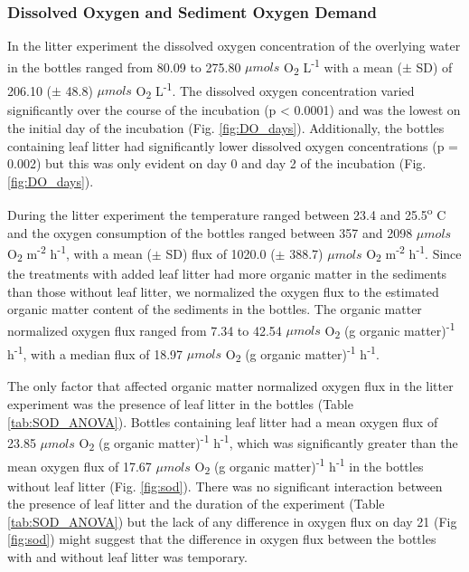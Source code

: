 \subsubsection{Dissolved Oxygen and Sediment Oxygen Demand}
In the litter experiment the dissolved oxygen concentration of the overlying water in the bottles ranged from 80.09 to 275.80 $\mu mols$ O\textsubscript{2} L\textsuperscript{-1} with a mean ($\pm$ SD) of 206.10 ($\pm$ 48.8) $\mu mols$ O\textsubscript{2} L\textsuperscript{-1}.  The dissolved oxygen concentration varied significantly over the course of the incubation (p < 0.0001) and was the lowest on the initial day of the incubation (Fig. \ref{fig:DO_days}). Additionally, the bottles containing leaf litter had significantly lower dissolved oxygen concentrations (p = 0.002) but this was only evident on day 0 and day 2 of the incubation (Fig. \ref{fig:DO_days}).

During the litter experiment the temperature ranged between 23.4 and 25.5\textsuperscript{o} C and the oxygen consumption of the bottles ranged between 357 and 2098 $\mu mols$ O\textsubscript{2} m\textsuperscript{-2} h\textsuperscript{-1}, with a mean ($\pm$ SD) flux of 1020.0 ($\pm$ 388.7) $\mu mols$ O\textsubscript{2} m\textsuperscript{-2} h\textsuperscript{-1}. Since the treatments with added leaf litter had more organic matter in the sediments than those without leaf litter, we normalized the oxygen flux to the estimated organic matter content of the sediments in the bottles. The organic matter normalized oxygen flux ranged from 7.34 to 42.54 $\mu mols$ O\textsubscript{2} (g organic matter)\textsuperscript{-1} h\textsuperscript{-1}, with a median flux of 18.97 $\mu mols$ O\textsubscript{2} (g organic matter)\textsuperscript{-1} h\textsuperscript{-1}.

The only factor that affected organic matter normalized oxygen flux in the litter experiment was the presence of leaf litter in the bottles (Table \ref{tab:SOD_ANOVA}). Bottles containing leaf litter had a mean oxygen flux of 23.85 $\mu mols$ O\textsubscript{2} (g organic matter)\textsuperscript{-1} h\textsuperscript{-1}, which was significantly greater than the mean oxygen flux of 17.67 $\mu mols$ O\textsubscript{2} (g organic matter)\textsuperscript{-1} h\textsuperscript{-1} in the bottles without leaf litter (Fig. \ref{fig:sod}). There was no significant interaction between the presence of leaf litter and the duration of the experiment (Table \ref{tab:SOD_ANOVA}) but the lack of any difference in oxygen flux on day 21 (Fig \ref{fig:sod}) might suggest that the difference in oxygen flux between the bottles with and without leaf litter was temporary. 

